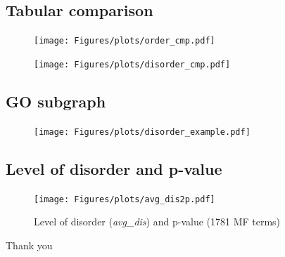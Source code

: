 \documentclass{beamer}
\begin{document}
\subsection{Tabular comparison}


\begin{frame}
  \begin{figure}[th]
    \vspace*{-0.8cm}
    \hspace*{-0.45cm}
    \texttt{[image: Figures/plots/order\_cmp.pdf]}
  \end{figure}
\end{frame}

\begin{frame}
  \begin{figure}[th]
    \vspace*{-0.8cm}
    \hspace*{-0.45cm}
    \texttt{[image: Figures/plots/disorder\_cmp.pdf]}
  \end{figure}
\end{frame}


\subsection{GO subgraph}

\begin{frame}
  \begin{figure}
    \vspace{-0.7cm}
    \texttt{[image: Figures/plots/disorder\_example.pdf]}
  \end{figure}
\end{frame}


\subsection{Level of disorder and p-value}
\begin{frame}
  \begin{figure}
    \centering
    \vspace{-0.5cm}
    \texttt{[image: Figures/plots/avg\_dis2p.pdf]}
    \caption {
      Level of disorder (\textit{avg\_dis}) and p-value (1781 MF terms)
    }
  \end{figure}
\end{frame}


\begin{frame}
  \begin{center}
    \Huge Thank you
  \end{center}
\end{frame}
\end{document}
